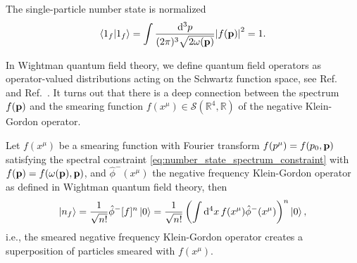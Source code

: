 \begin{corollary}
	The single-particle number state is normalized
	\begin{equation}
		\braket{1_f}{1_f}
		=
		\int\frac{\dd[3]{p}}{(2\pi)^3\sqrt{2\omega(\vb{p})}}
		\abs{f(\vb{p})}^2
		=
		1
		.
	\end{equation}
\end{corollary}
In Wightman quantum field theory, we define quantum field operators as operator-valued distributions acting on the Schwartz function space, see Ref.~\cite{Bogolubov1989} and Ref.~\cite{Streater2016}.
It turns out that there is a deep connection between the spectrum $f(\vb{p})$ and the smearing function $f(x^\mu)\in\mathcal{S}(\mathbb{R}^4,\mathbb{R})$ of the negative Klein-Gordon operator.

\begin{lemma}\label{thm:qkg_number_state_smearing}
	Let $f(x^\mu)$ be a smearing function with Fourier transform $f(p^\mu)=f(p_0,\vb{p})$ satisfying the spectral constraint \cref{eq:number_state_spectrum_constraint} with $f(\vb{p})=f(\omega(\vb{p}),\vb{p})$, and $\hat\phi^-(x^\mu)$ the negative frequency Klein-Gordon operator as defined in Wightman quantum field theory, then
	\begin{equation}
		\ket{n_f}
		=
		\frac{1}{\sqrt{n!}}
		\hat\phi^-[f]^n
		\ket{0}
		=
		\frac{1}{\sqrt{n!}}
		\left(
			\int\dd[4]{x}
			f(x^\mu)
			\hat\phi^-(x^\mu)
		\right)^n
		\ket{0}
		\label{eq:qkg_number_state_smearing}
		,
	\end{equation}
	i.e., the smeared negative frequency Klein-Gordon operator creates a superposition of particles smeared with $f(x^\mu)$.
\end{lemma}
